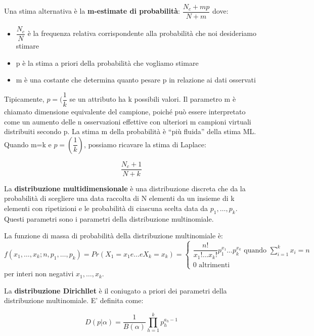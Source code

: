 \documentclass[a4paper]{extarticle}
\begin{document}
Una stima alternativa è la \textbf{m-estimate di probabilità}: $\dfrac{N_c + mp}{N+m}$ dove:

\begin{itemize}
\item $\dfrac{N_c}{N}$ è la frequenza relativa corrispondente alla probabilità che noi desideriamo stimare
\item p è la stima a priori della probabilità che vogliamo stimare
\item m è una costante che determina quanto pesare p in relazione ai dati osservati
\end{itemize}

Tipicamente, $p=(\dfrac{1}{k}$ se un attributo ha k possibili valori. Il parametro m è chiamato dimensione equivalente del campione, poiché può essere interpretato come un aumento delle n osservazioni effettive con ulteriori m campioni virtuali distribuiti secondo p. La stima m della probabilità è “più fluida” della stima ML. Quando m=k e $p=(\dfrac{1}{k})$, possiamo ricavare la stima di Laplace:

\begin{equation*}
\dfrac{N_c+1}{N+k}
\end{equation*}

La \textbf{distribuzione multidimensionale} è una distribuzione discreta  che da la probabilità di scegliere una data raccolta di N elementi da un insieme di k elementi con ripetizioni e le probabilità di ciascuna scelta data da $p_1, \dots,p_k$.  Questi parametri sono i parametri della distribuzione multinomiale.

La funzione di massa di probabilità della distribuzione multinomiale è:
\begin{equation*}
f(x_1,\dots,x_k;n,p_1,\dots,p_k) = Pr(X_1 = x_1 e \dots e X_k =x_k) =
\begin{cases}
		\dfrac{n!}{x_1!\dots x_k!} p_1^{x_1}\dots p_k^{x_k} \text{ quando }  \sum\limits_{i=1}^k x_i = n \\
		0 \text{ altrimenti}
	\end{cases}
\end{equation*}
per interi non negativi $x_1,\dots,x_k$.

La \textbf{distribuzione Dirichllet} è il coniugato a priori dei parametri della distribuzione multinomiale. E' definita come:

\begin{equation*}
D(p| \alpha) = \dfrac{1}{B(\alpha)}\prod_{h=1}^k p_h^{a_h-1}
\end{equation*}
\end{document}
